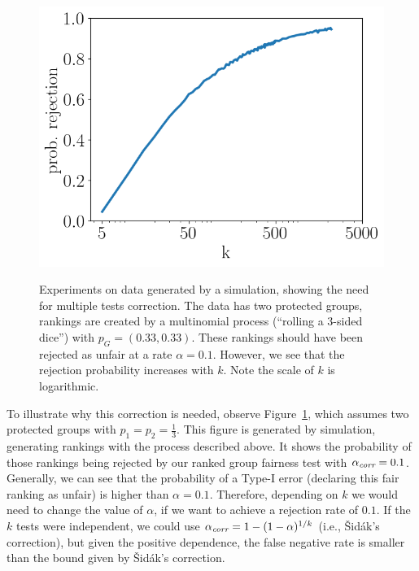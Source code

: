 \begin{figure}[h]
	\centering
	{\includegraphics[width=.48\textwidth]{pics/failProbPlotMultinom.png}}
	\caption{Experiments on data generated by a simulation, showing the need for multiple tests correction.
		The data has two protected groups, rankings are created by a multinomial process (``rolling a 3-sided dice'') with $p_G = (0.33, 0.33)$.
		These rankings should have been rejected as unfair at a rate $\alpha = 0.1$.
		However, we see that the rejection probability increases with $k$.
		Note the scale of $k$ is logarithmic.}
	\label{fig:why-adjustment-is-needed-multinomial}
\end{figure}
To illustrate why this correction is needed, observe Figure~\ref{fig:why-adjustment-is-needed-multinomial}, which assumes two protected groups with $p_1=p_2=\frac{1}{3}$.
%
This figure is generated by simulation, generating rankings with the process described above.
%
It shows the probability of those rankings being rejected by our ranked group fairness test with $\alpha_\textit{corr}=0.1$.
%
Generally, we can see that the probability of a Type-I error (declaring this fair ranking as unfair) is higher than $\alpha = 0.1$.
%
Therefore, depending on $k$ we would need to change the value of $\alpha$, if we want to achieve a rejection rate of $0.1$.
%
If the $k$ tests were independent, we could use $\alpha_\textit{corr} = 1 - (1 - \alpha)^{1/k}$ (i.e., {\v S}id{\'a}k's correction), but given the positive dependence, the false negative rate is smaller than the bound given by {\v S}id{\'a}k's correction.

